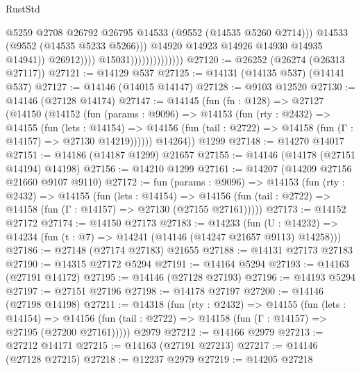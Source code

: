 \begin{lexlean}{RustStd}
\begin{coremodule}
                                                @5259
                                                @2708
                                                @26792
                                                @26795
                                                @14533
                                                (@9552 (@14535 @5260 @2714)))
                                              @14533
                                              (@9552 (@14535 @5233 @5266)))
                                            @14920
                                            @14923
                                            @14926
                                            @14930
                                            @14935
                                            @14941))
                                        @26912))))
                                @15031))))))))))))))
@27120 := @26252 (@26274 (@26313 @27117))
@27121 := @14129 @537
@27125 := @14131 (@14135 @537) (@14141 @537)
@27127 := @14146 (@14015 @14147)
@27128 := @9103 @12520
@27130 := @14146 (@27128 @14174)
@27147 := @14145
    (fun (fn : @128) =>
    @27127
      (@14150
        (@14152
          (fun (params : @9096) =>
          @14153
            (fun (rty : @2432) =>
            @14155
              (fun (lets : @14154) =>
              @14156 (fun (tail : @2722) => @14158 (fun (Γ : @14157) => @27130 @14219))))))
        @14264))
    @1299
@27148 := @14270 @14017
@27151 := @14186 (@14187 @1299) @21657
@27155 := @14146 (@14178 (@27151 @14194) @14198)
@27156 := @14210 @1299
@27161 := @14207 (@14209 @27156 @21660 @9107 @9110)
@27172 := fun (params : @9096) =>
  @14153
    (fun (rty : @2432) =>
    @14155
      (fun (lets : @14154) =>
      @14156 (fun (tail : @2722) => @14158 (fun (Γ : @14157) => @27130 (@27155 @27161)))))
@27173 := @14152 @27172
@27174 := @14150 @27173
@27183 := @14233
    (fun (U : @14232) => @14234 (fun (t : @7) => @14241 (@14146 (@14247 @21657 @9113) @14258)))
@27186 := @27148 (@27174 @27183) @21655
@27188 := @14131 @27173 @27183
@27190 := @14315 @27172 @5294
@27191 := @14164 @5294
@27193 := @14163 (@27191 @14172)
@27195 := @14146 (@27128 @27193)
@27196 := @14193 @5294
@27197 := @27151 @27196
@27198 := @14178 @27197
@27200 := @14146 (@27198 @14198)
@27211 := @14318
    (fun (rty : @2432) =>
    @14155
      (fun (lets : @14154) =>
      @14156 (fun (tail : @2722) => @14158 (fun (Γ : @14157) => @27195 (@27200 @27161)))))
    @2979
@27212 := @14166 @2979
@27213 := @27212 @14171
@27215 := @14163 (@27191 @27213)
@27217 := @14146 (@27128 @27215)
@27218 := @12237 @2979
@27219 := @14205 @27218

\end{coremodule}
\end{lexlean}
